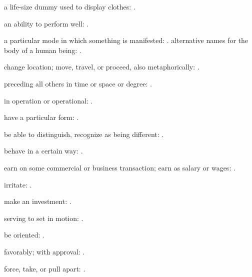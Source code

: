   a life-size dummy used to display clothes:   .

  an ability to perform well: .

  a particular mode in which something is manifested: . alternative names for the body of a human being:   .

  change location; move, travel, or proceed, also metaphorically:   .

  preceding all others in time or space or degree: .

  in operation or operational: .

  have a particular form:   .

  be able to distinguish, recognize as being different: .

  behave in a certain way: .

  earn on some commercial or business transaction; earn as salary or wages:   .

  irritate:   .

  make an investment:   .

  serving to set in motion:   .

  be oriented:   .

  favorably; with approval: .

  force, take, or pull apart:   .

